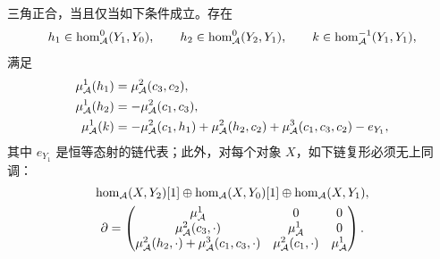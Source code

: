 \begin{lemma}\label{st:3.7}
三角正合，当且仅当如下条件成立。存在
\[
h_1\in\hom^0_{\mathcal A}(Y_1,Y_0),\qquad h_2\in\hom^0_{\mathcal A}(Y_2,Y_1),\qquad k\in\hom^{-1}_{\mathcal A}(Y_1,Y_1),
\]
满足
\begin{equation}\label{eq:3.10}
\begin{aligned}
\mu^1_{\mathcal A}(h_1)&=\mu^2_{\mathcal A}(c_3,c_2),\\
\mu^1_{\mathcal A}(h_2)&=-\mu^2_{\mathcal A}(c_1,c_3),\\
\mu^1_{\mathcal A}(k)&=-\mu^2_{\mathcal A}(c_1,h_1)+\mu^2_{\mathcal A}(h_2,c_2)+\mu^3_{\mathcal A}(c_1,c_3,c_2)-e_{Y_1},
\end{aligned}
\end{equation}
其中 $e_{Y_1}$ 是恒等态射的链代表；此外，对每个对象 $X$，如下链复形必须无上同调：
\begin{equation}\label{eq:3.11}
\begin{gathered}
\hom_{\mathcal A}(X,Y_2)[1]\oplus\hom_{\mathcal A}(X,Y_0)[1]\oplus\hom_{\mathcal A}(X,Y_1),\\
\partial=\begin{pmatrix}
\mu^1_{\mathcal A}&0&0\\
\mu^2_{\mathcal A}(c_3,\cdot)&\mu^1_{\mathcal A}&0\\
\mu^2_{\mathcal A}(h_2,\cdot)+\mu^3_{\mathcal A}(c_1,c_3,\cdot)&\mu^2_{\mathcal A}(c_1,\cdot)&\mu^1_{\mathcal A}
\end{pmatrix}.
\end{gathered}
\end{equation}
\end{lemma}
